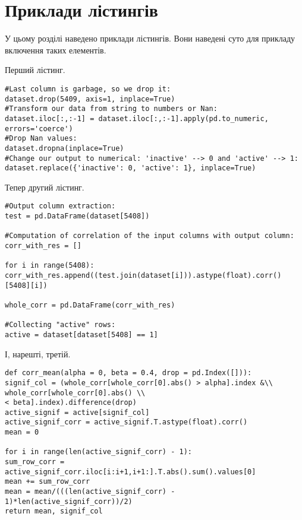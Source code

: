 \chapter{Приклади лістингів}

У цьому розділі наведено приклади лістингів. Вони наведені суто для прикладу включення таких елементів. 

Перший лістинг.

\begin{lstlisting}
#Last column is garbage, so we drop it:
dataset.drop(5409, axis=1, inplace=True)
#Transform our data from string to numbers or Nan:
dataset.iloc[:,:-1] = dataset.iloc[:,:-1].apply(pd.to_numeric, errors='coerce')
#Drop Nan values:
dataset.dropna(inplace=True)
#Change our output to numerical: 'inactive' --> 0 and 'active' --> 1:
dataset.replace({'inactive': 0, 'active': 1}, inplace=True)
\end{lstlisting}
 
Тепер другий лістинг.
\begin{lstlisting}
#Output column extraction:
test = pd.DataFrame(dataset[5408])

#Computation of correlation of the input columns with output column:
corr_with_res = []

for i in range(5408):
corr_with_res.append((test.join(dataset[i])).astype(float).corr()[5408][i])

whole_corr = pd.DataFrame(corr_with_res)

#Collecting "active" rows:
active = dataset[dataset[5408] == 1]
\end{lstlisting}

І, нарешті, третій. 

\begin{lstlisting}
def corr_mean(alpha = 0, beta = 0.4, drop = pd.Index([])):
signif_col = (whole_corr[whole_corr[0].abs() > alpha].index &\\
whole_corr[whole_corr[0].abs() \\
< beta].index).difference(drop)
active_signif = active[signif_col]
active_signif_corr = active_signif.T.astype(float).corr()
mean = 0

for i in range(len(active_signif_corr) - 1):
sum_row_corr = active_signif_corr.iloc[i:i+1,i+1:].T.abs().sum().values[0]
mean += sum_row_corr
mean = mean/(((len(active_signif_corr) - 1)*len(active_signif_corr))/2)
return mean, signif_col
\end{lstlisting}
